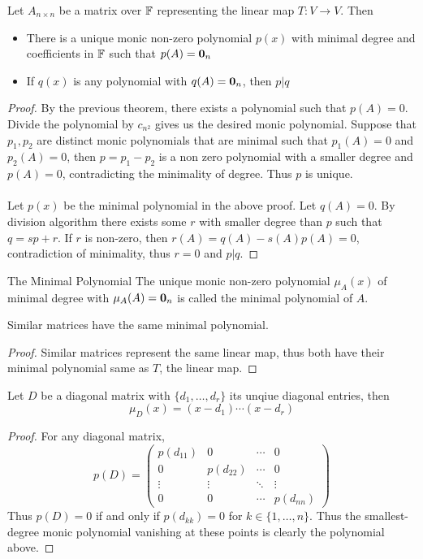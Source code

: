 \documentclass[a4paper]{article}
\begin{document}
\begin{thm}{}{} Let $A_{n\times n}$ be a matrix over $\mathbb{F}$ representing the linear map $T:V\to V$. Then 
\begin{itemize}
\item There is a unique monic non-zero polynomial $p(x)$ with minimal degree and coefficients in $\mathbb{F}$ such that $p(A)=\vb{0}_n$
\item If $q(x)$ is any polynomial with $q(A)=\vb{0}_n$, then $p|q$
\end{itemize}\tcbline\begin{proof} By the previous theorem, there exists a polynomial such that $p(A)=0$. Divide the polynomial by $c_{n^2}$ gives us the desired monic polynomial. Suppose that $p_1,p_2$ are distinct monic polynomials that are minimal such that $p_1(A)=0$ and $p_2(A)=0$, then $p=p_1-p_2$ is a non zero polynomial with a smaller degree and $p(A)=0$, contradicting the minimality of degree. Thus $p$ is unique. \\~\\
Let $p(x)$ be the minimal polynomial in the above proof. Let $q(A)=0$. By division algorithm there exists some $r$ with smaller degree than $p$ such that $q=sp+r$. If $r$ is non-zero, then $r(A)=q(A)-s(A)p(A)=0$, contradiction of minimality, thus $r=0$ and $p|q$. 
\end{proof}
\end{thm}

\begin{defn}{The Minimal Polynomial}{} The unique monic non-zero polynomial $\mu_A(x)$ of minimal degree with $\mu_A(A)=\vb{0}_n$ is called the minimal polynomial of $A$. 
\end{defn}

\begin{prp}{}{} Similar matrices have the same minimal polynomial. \tcbline\begin{proof} Similar matrices represent the same linear map, thus both have their minimal polynomial same as $T$, the linear map. 
\end{proof}
\end{prp}

\begin{prp}{}{} Let $D$ be a diagonal matrix with $\{d_1,\dots,d_r\}$ its unqiue diagonal entries, then $$\mu_D(x)=(x-d_1)\cdots(x-d_r)$$\tcbline
\begin{proof} For any diagonal matrix, $$p(D)=\begin{pmatrix}p(d_{11}) & 0 & \cdots & 0\\ 0 & p(d_{22}) & \cdots & 0 \\ \vdots & \vdots & \ddots & \vdots\\ 0 & 0 & \cdots & p(d_{nn})\end{pmatrix}$$ Thus $p(D)=0$ if and only if $p(d_{kk})=0$ for $k\in\{1,\dots,n\}$. Thus the smallest-degree monic polynomial vanishing at these points is clearly the polynomial above. 
\end{proof}
\end{prp}
\end{document}
